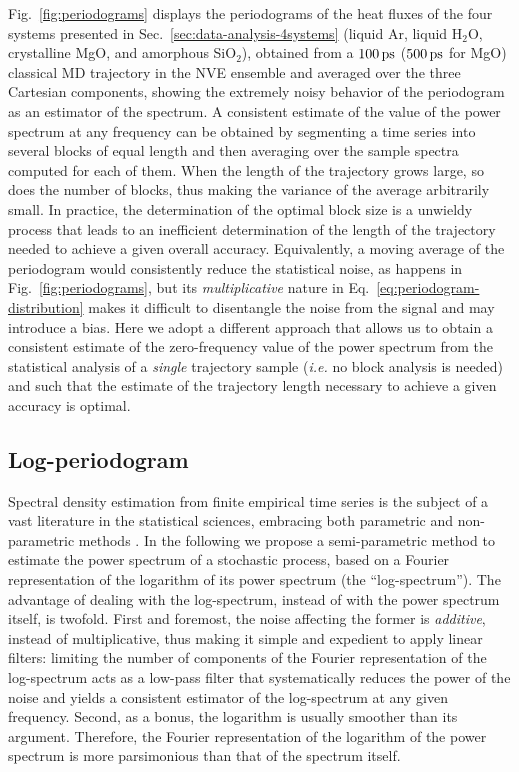 Fig.~\ref{fig:periodograms} displays the periodograms of the heat fluxes of the four systems presented in Sec.~\ref{sec:data-analysis-4systems} (liquid Ar, liquid H$_2$O, crystalline MgO, and amorphous SiO$_2$), obtained from a $100\,\mathrm{ps}$ ($500\,\mathrm{ps}$ for MgO) classical MD trajectory in the NVE ensemble and averaged over the three Cartesian components, showing the extremely noisy behavior of the periodogram as an estimator of the spectrum. 
A consistent estimate of the value of the power spectrum at any frequency can be obtained by segmenting a time series into several blocks of equal length and then averaging over the sample spectra computed for each of them. When the length of the trajectory grows large, so does the number of blocks, thus making the variance of the average arbitrarily small. In practice, the determination of the optimal block size is a unwieldy process that leads to an inefficient determination of the length of the trajectory needed to achieve a given overall accuracy. 
Equivalently, a moving average \cite{MovingAverage} of the periodogram would consistently reduce the statistical noise, as happens in Fig.~\ref{fig:periodograms}, but its \emph{multiplicative} nature in Eq.~\eqref{eq:periodogram-distribution} makes it difficult to disentangle the noise from the signal and may introduce a bias. 
Here we adopt a different approach that allows us to obtain a consistent estimate of the zero-frequency value of the power spectrum from the statistical analysis of a \emph{single} trajectory sample (\emph{i.e.} no block analysis is needed) and such that the estimate of the trajectory length necessary to achieve a given accuracy is optimal.

\subsection{Log-periodogram}
Spectral density estimation from finite empirical time series is the subject of a vast literature in the statistical sciences, embracing both parametric and non-parametric methods \cite{Stoica2005}. In the following we propose a semi-parametric method to estimate the power spectrum of a stochastic process, based on a Fourier representation of the logarithm of its power spectrum (the ``log-spectrum''). The advantage of dealing with the log-spectrum, instead of with the power spectrum itself, is twofold. First and foremost, the noise affecting the former is \emph{additive}, instead of multiplicative, thus making it simple and expedient to apply linear filters: limiting the number of components of the Fourier representation of the log-spectrum acts as a low-pass filter that systematically reduces the power of the noise and yields a consistent estimator of the log-spectrum at any given frequency. Second, as a bonus, the logarithm is usually smoother than its argument. Therefore, the Fourier representation of the logarithm of the power spectrum is more parsimonious than that of the spectrum itself.

